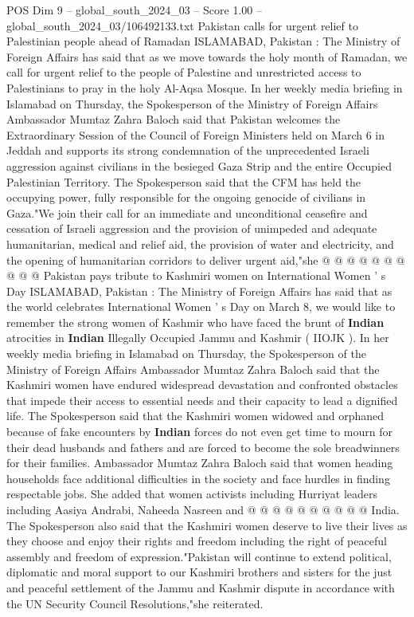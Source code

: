 \begin{textsample}{POS Dim 9 – global\_south\_2024\_03 – Score 1.00 – global\_south\_2024\_03/106492133.txt}  \label{ex:f9_pos_071}
Pakistan calls for urgent relief to Palestinian people ahead of Ramadan ISLAMABAD, Pakistan : The Ministry of Foreign Affairs has said that as we move towards the holy month of Ramadan, we call for urgent relief to the people of Palestine and unrestricted access to Palestinians to pray in the holy Al-Aqsa Mosque.
In her weekly media briefing in Islamabad on Thursday, the Spokesperson of the Ministry of Foreign Affairs Ambassador Mumtaz Zahra Baloch said that Pakistan welcomes the Extraordinary Session of the Council of Foreign Ministers held on March 6 in Jeddah and supports its strong condemnation of the unprecedented Israeli aggression against civilians in the besieged Gaza Strip and the entire Occupied Palestinian Territory.
The Spokesperson said that the CFM has held the occupying power, fully responsible for the ongoing genocide of civilians in Gaza."We join their call for an immediate and unconditional ceasefire and cessation of Israeli aggression and the provision of unimpeded and adequate humanitarian, medical and relief aid, the provision of water and electricity, and the opening of humanitarian corridors to deliver urgent aid,"she @ @ @ @ @ @ @ @ @ @ Pakistan pays tribute to Kashmiri women on International Women ' s Day ISLAMABAD, Pakistan : The Ministry of Foreign Affairs has said that as the world celebrates International Women ' s Day on March 8, we would like to remember the strong women of Kashmir who have faced the brunt of \textbf{Indian} atrocities in \textbf{Indian} Illegally Occupied Jammu and Kashmir ( IIOJK ).
In her weekly media briefing in Islamabad on Thursday, the Spokesperson of the Ministry of Foreign Affairs Ambassador Mumtaz Zahra Baloch said that the Kashmiri women have endured widespread devastation and confronted obstacles that impede their access to essential needs and their capacity to lead a dignified life.
The Spokesperson said that the Kashmiri women widowed and orphaned because of fake encounters by \textbf{Indian} forces do not even get time to mourn for their dead husbands and fathers and are forced to become the sole breadwinners for their families.
Ambassador Mumtaz Zahra Baloch said that women heading households face additional difficulties in the society and face hurdles in finding respectable jobs.
She added that women activists including Hurriyat leaders including Aasiya Andrabi, Naheeda Nasreen and @ @ @ @ @ @ @ @ @ @ India.
The Spokesperson also said that the Kashmiri women deserve to live their lives as they choose and enjoy their rights and freedom including the right of peaceful assembly and freedom of expression."Pakistan will continue to extend political, diplomatic and moral support to our Kashmiri brothers and sisters for the just and peaceful settlement of the Jammu and Kashmir dispute in accordance with the UN Security Council Resolutions,"she reiterated.

\end{textsample}
